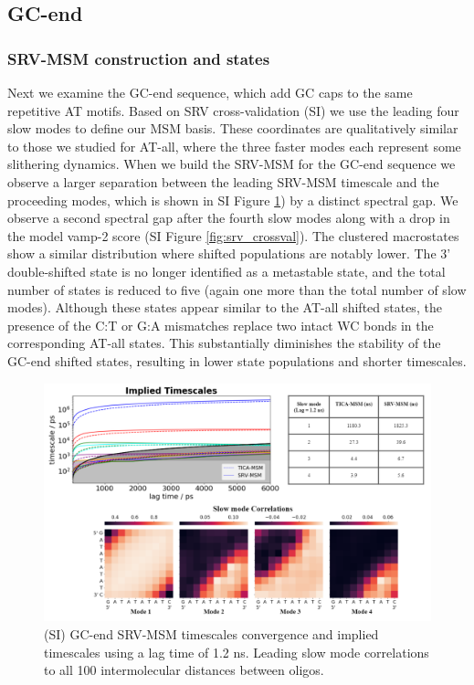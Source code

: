 \documentclass[journal=jpcbfk,manuscript=article]{achemso}
\begin{document}
\subsection{\label{sec:Results}GC-end}

\subsubsection{\label{sec:Results}SRV-MSM construction and states}
	
Next we examine the GC-end sequence, which add GC caps to the same repetitive AT motifs. Based on SRV cross-validation (SI) we use the leading four slow modes to define our MSM basis.  These coordinates are qualitatively similar to those we studied for AT-all, where the three faster modes each represent some slithering dynamics. When we build the SRV-MSM for the GC-end sequence we observe a larger separation between the leading SRV-MSM timescale and the proceeding modes, which is shown in SI Figure \ref{fig:GC-end_dynamic}) by a distinct spectral gap. We observe a second spectral gap after the fourth slow modes along with a drop in the model vamp-2 score (SI Figure \ref{fig:srv_crossval}). The clustered macrostates show a similar distribution where shifted populations are notably lower. The 3' double-shifted state is no longer identified as a metastable state, and the total number of states is reduced to five (again one more than the total number of slow modes). Although these states appear similar to the AT-all shifted states, the presence of the C:T or G:A mismatches replace two intact WC bonds in the corresponding AT-all states. This substantially diminishes the stability of the GC-end shifted states, resulting in lower state populations and shorter timescales.

\begin{figure}[ht!]
	\begin{center}
        \includegraphics[width=\textwidth]{Figs/figs_0804/GC-end_dynamic.png}
        \caption{(SI) GC-end SRV-MSM timescales convergence and implied timescales using a lag time of 1.2 ns. Leading slow mode correlations to all 100 intermolecular distances between oligos.}
        \label{fig:GC-end_dynamic}
	\end{center}
\end{figure}
\end{document}
